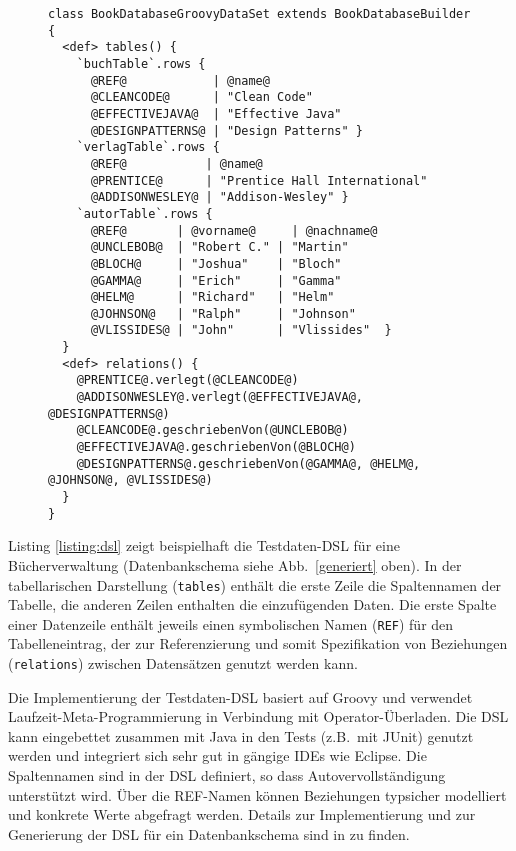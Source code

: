 \begin{figure}[tb]
\begin{lstlisting}[caption=Beispiel eines mittels DSL beschriebenes Testdaten-Set (Table Builder API)., style=java, label=listing:dsl]
class BookDatabaseGroovyDataSet extends BookDatabaseBuilder {
  <def> tables() {
    `buchTable`.rows {
      @REF@            | @name@
      @CLEANCODE@      | "Clean Code"      
      @EFFECTIVEJAVA@  | "Effective Java"  
      @DESIGNPATTERNS@ | "Design Patterns" }
    `verlagTable`.rows {
      @REF@           | @name@
      @PRENTICE@      | "Prentice Hall International"
      @ADDISONWESLEY@ | "Addison-Wesley" }
    `autorTable`.rows {
      @REF@       | @vorname@     | @nachname@
      @UNCLEBOB@  | "Robert C." | "Martin"
      @BLOCH@     | "Joshua"    | "Bloch"
      @GAMMA@     | "Erich"     | "Gamma"
      @HELM@      | "Richard"   | "Helm"
      @JOHNSON@   | "Ralph"     | "Johnson"
      @VLISSIDES@ | "John"      | "Vlissides"  }
  }
  <def> relations() {
    @PRENTICE@.verlegt(@CLEANCODE@)
    @ADDISONWESLEY@.verlegt(@EFFECTIVEJAVA@, @DESIGNPATTERNS@)
    @CLEANCODE@.geschriebenVon(@UNCLEBOB@)
    @EFFECTIVEJAVA@.geschriebenVon(@BLOCH@)
    @DESIGNPATTERNS@.geschriebenVon(@GAMMA@, @HELM@, @JOHNSON@, @VLISSIDES@) 
  }
}
\end{lstlisting}
\end{figure}


Listing \ref{listing:dsl} zeigt beispielhaft die Testdaten-DSL für eine Bücherverwaltung (Datenbankschema siehe Abb.~\ref{generiert} oben). In der tabellarischen Darstellung (\texttt{tables}) enthält die erste Zeile die Spaltennamen der Tabelle, die anderen Zeilen enthalten die einzufügenden Daten. Die erste Spalte einer Datenzeile enthält jeweils einen symbolischen Namen (\texttt{REF}) für den Tabelleneintrag, der zur Referenzierung und somit Spezifikation von Beziehungen (\texttt{relations}) zwischen Datensätzen genutzt werden kann.

Die Implementierung der Testdaten-DSL basiert auf Groovy und verwendet Laufzeit-Meta-Programmierung in Verbindung mit Operator-Überladen. Die DSL kann eingebettet zusammen mit Java in den Tests (z.B.~mit JUnit) genutzt werden und integriert sich sehr gut in gängige IDEs wie Eclipse. Die Spaltennamen sind in der DSL definiert, so dass Autovervollständigung unterstützt wird. 
%
%
Über die REF-Namen können Beziehungen typsicher modelliert und konkrete Werte abgefragt werden. 
%
Details zur Implementierung und zur Generierung der DSL für ein Datenbankschema sind in \cite{MT:Moll:2013} zu finden.


